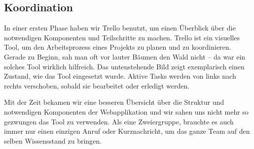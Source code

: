 \subsection{Koordination}

In einer ersten Phase haben wir Trello benutzt, um einen Überblick über die notwendigen Komponenten und Teilschritte zu machen. Trello ist ein visuelles Tool, um den Arbeitsprozess eines Projekts zu planen und zu koordinieren. Gerade zu Beginn, sah man oft vor lauter Bäumen den Wald nicht -- da war ein solches Tool wirklich hilfreich. Das untenstehende Bild zeigt exemplarisch einen Zustand, wie das Tool eingesetzt wurde. Aktive Tasks werden von links nach rechts verschoben, sobald sie bearbeitet oder erledigt werden.


Mit der Zeit bekamen wir eine besseren Übersicht über die Struktur und notwendigen Komponenten der Webapplikation und wir sahen uns nicht mehr so gezwungen das Tool zu verwenden. Als eine Zweiergruppe, brauchte es auch immer nur einen einzigen Anruf oder Kurznachricht, um das ganze Team auf den selben Wissensstand zu bringen.